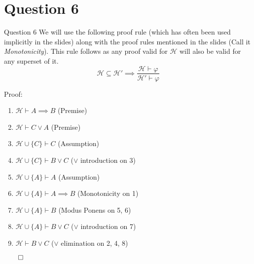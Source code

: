 \documentclass{beamer}
\begin{document}
{        %
    }
    \section{Question 6}
    {
        \begin{frame}{Question 6}
            We will use the following proof rule (which has often been used implicitly in the slides) along with the proof rules mentioned in the slides (Call it \textit{Monotonicity}). This rule follows as any proof valid for $\mathcal{H}$ will also be valid for any superset of it.
            \begin{equation*}
                \mathcal{H} \subseteq \mathcal{H}' \implies \frac{\mathcal{H} \vdash \varphi}{\mathcal{H}' \vdash \varphi}
            \end{equation*}

            Proof:
            \begin{enumerate}
                \item $\mathcal{H} \vdash A \implies B$ (Premise)
                \item $\mathcal{H} \vdash C \lor A$ (Premise)
                \item $\mathcal{H} \cup \{C\} \vdash C$ (Assumption)
                \item $\mathcal{H} \cup \{C\} \vdash B \lor C$ ($\lor$ introduction on 3)
                \item $\mathcal{H} \cup \{A\} \vdash A$ (Assumption)
                \item $\mathcal{H} \cup \{A\} \vdash A \implies B$ (Monotonicity on 1)
                \item $\mathcal{H} \cup \{A\} \vdash B$ (Modus Ponens on 5, 6)
                \item $\mathcal{H} \cup \{A\} \vdash B \lor C$ ($\lor$ introduction on 7)
                \item $\mathcal{H} \vdash B \lor C$ ($\lor$ elimination on 2, 4, 8)
            \end{enumerate}
            $\qed$
        \end{frame}
    }
\end{document}
